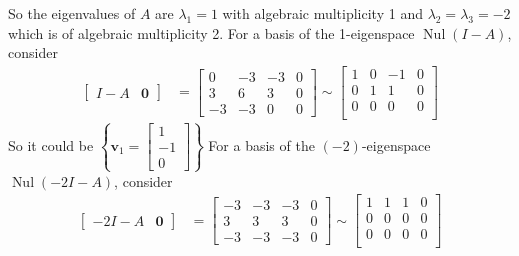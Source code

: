 \documentclass{beamer}
\DeclareMathOperator{\Nul}{Nul}
\theoremstyle{definition}
\theoremstyle{remark}
\begin{document}
\begin{frame}[t]
\begin{solution}
So the eigenvalues of $A$ are $\lambda_1=1$ with algebraic multiplicity 1 and $\lambda_2=\lambda_3=-2$ which is of algebraic multiplicity 2. For a basis of the 1-eigenspace $\Nul(I-A)$, consider
\begin{align*}
\left[\begin{array}{c|c}
I-A&\mathbf0
\end{array}\right]&=\left[\begin{array}{ccc|c}
0&-3&-3&0\\
3&6&3&0\\
-3&-3&0&0
\end{array}\right]\sim\left[\begin{array}{ccc|c}
1&0&-1&0\\
0&1&1&0\\
0&0&0&0\\
\end{array}\right]
\end{align*}
So it could be $\left\{\mathbf v_1=\begin{bmatrix}
1\\-1\\0
\end{bmatrix}\right\}$\pause
For a basis of the $(-2)$-eigenspace $\Nul(-2I-A)$, consider
\begin{align*}
\left[\begin{array}{c|c}
-2I-A&\mathbf0
\end{array}\right]&=\left[\begin{array}{ccc|c}
-3&-3&-3&0\\
3&3&3&0\\
-3&-3&-3&0
\end{array}\right]\sim\left[\begin{array}{ccc|c}
1&1&1&0\\
0&0&0&0\\
0&0&0&0\\
\end{array}\right]
\end{align*}
\end{solution}
\end{frame}
\end{document}
